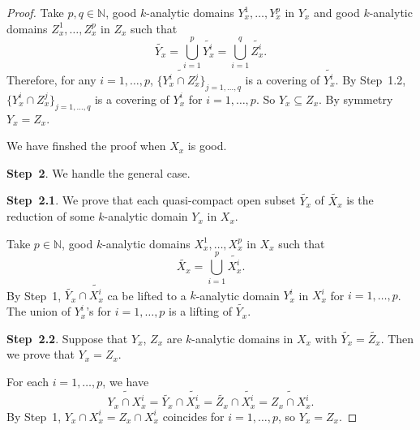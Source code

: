 \begin{proof}
    Take $p,q\in \mathbb{N}$, good $k$-analytic domains $Y_x^1,\ldots,Y_x^p$ in $Y_x$ and good $k$-analytic domains $Z_x^1,\ldots,Z_x^p$ in $Z_x$ such that 
    \[
        \widetilde{Y_x}=\bigcup_{i=1}^p   \widetilde{Y_x^i}=\bigcup_{i=1}^q   \widetilde{Z_x^i}.
    \]
    Therefore, for any $i=1,\ldots,p$, $\{\widetilde{Y_x^i\cap Z^j_x}\}_{j=1,\ldots,q}$ is a covering of $\widetilde{Y^i_x}$. By Step~1.2, $\{Y_x^i\cap Z^j_x\}_{j=1,\ldots,q}$ is a covering of $Y_x^i$ for $i=1,\dots,p$.  So $Y_x\subseteq Z_x$. By symmetry $Y_x=Z_x$.

    We have finshed the proof when $X_x$ is good.


    \textbf{Step~2}. We handle the general case. 

    \textbf{Step~2.1}. We prove that each quasi-compact open subset $\widetilde{Y_x}$ of $\widetilde{X_x}$ is the reduction of some $k$-analytic domain $Y_x$ in $X_x$. 

    Take $p\in \mathbb{N}$, good $k$-analytic domains $X_x^1,\ldots,X_x^p$ in $X_x$ such that 
    \[
        \widetilde{X_x}=\bigcup_{i=1}^p   \widetilde{X_x^i}.
    \]
    By Step~1, $\widetilde{Y_x}\cap \widetilde{X_x^i}$ ca be lifted to a $k$-analytic domain $Y^i_x$ in $X_x^i$ for $i=1,\ldots,p$. The union of $Y^i_x$'s for $i=1,\ldots,p$ is a lifting of $\widetilde{Y_x}$.

    \textbf{Step~2.2}. Suppose that $Y_x$, $Z_x$ are $k$-analytic domains in $X_x$ with $\widetilde{Y_x}=\widetilde{Z_x}$. Then we prove that $Y_x=Z_x$.

    For each $i=1,\ldots,p$, we have
    \[
        \widetilde{Y_x\cap X_x^i}=\widetilde{Y_x}\cap \widetilde{X_x^i}=\widetilde{Z_x}\cap \widetilde{X_x^i}= \widetilde{Z_x\cap X_x^i}. 
    \]
    By Step~1, $Y_x\cap X_x^i=Z_x\cap X_x^i$ coincides for $i=1,\ldots,p$, so $Y_x=Z_x$.
\end{proof}

